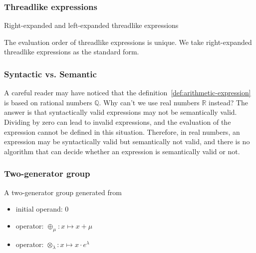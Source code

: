 \documentclass[aspectratio=169]{beamer}
\begin{document}
\begin{frame}
    \frametitle{Threadlike expressions}
    Right-expanded and left-expanded threadlike expressions
    \begin{figure}[ht]
        \centering
    \end{figure}
    The evaluation order of threadlike expressions is unique. We take right-expanded threadlike expressions as the standard form.
\end{frame}

\begin{frame}
    \frametitle{Syntactic vs. Semantic}
    A careful reader may have noticed that the definition~\ref{def:arithmetic-expression} is based on rational numbers $\mathbb{Q}$.
    Why can't we use real numbers $\mathbb{R}$ instead?
    The answer is that syntactically valid expressions may not be semantically valid.
    Dividing by zero can lead to invalid expressions, and the evaluation of the expression cannot be defined in this situation.
    Therefore, in real numbers, an expression may be syntactically valid but semantically not valid,
    and there is no algorithm that can decide whether an expression is semantically valid or not.
\end{frame}

\begin{frame}
    \frametitle{Two-generator group}
    A two-generator group generated from
    \begin{itemize}
        \item initial operand: $0$
        \item operator: $\oplus_\mu: x \mapsto x + \mu$
        \item operator: $\otimes_\lambda: x \mapsto x \cdot e^\lambda$
    \end{itemize}
\end{frame}
\end{document}

